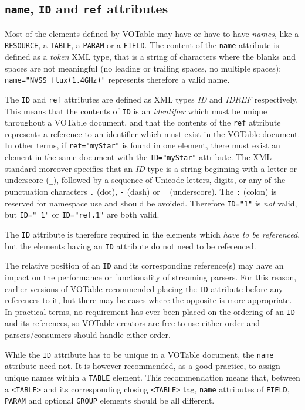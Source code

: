 \documentclass[11pt,a4paper]{ivoa}
\let\fg=\color
\def\slash {{\fg{blue}/}}
\def\attr#1{{\tt{\fg{DarkRed}#1}}}
\def\elem#1{{\tt{\fg{DarkRed}#1}}}
\def\attrval#1#2{{\tt{\fg{DarkRed}#1}="{\fg{DarkPurple}#2}"}}
\def\elemdef#1#2{{\tt\fg{blue}<}{\tt{\fg{DarkRed}#1}#2}{\tt\fg{blue}>}}
\begin{document}
\subsection{{\attr{name}, \attr{ID} and \attr{ref} attributes}}
\label{sec:name}

Most of the elements defined by VOTable may have or have to have {\em names},
like a \elem{RESOURCE}, a \elem{TABLE}, a \elem{PARAM} or a \elem{FIELD}.
The content of the \attr{name} attribute is defined as a {\em token}
XML type,
that is a string of characters where the blanks and spaces are not
meaningful (no leading or trailing spaces, no multiple spaces):
\attrval{name}{NVSS flux(1.4GHz)} represents therefore
a valid name.

The \attr{ID} and \attr{ref} attributes are defined as XML types {\em ID}
and {\em IDREF} respectively. This means that the contents of \attr{ID}
is an {\em identifier} which must be {unique} throughout a VOTable document,
and that the contents of the \attr{ref} attribute represents a reference to
an identifier which must exist in the VOTable document.
In other terms, if \attrval{ref}{myStar} is found in one element,
there must exist an element in the same document with the
\attrval{ID}{myStar} attribute. The XML standard moreover specifies
that an {\em ID} type is a string beginning with a letter or
underscore ({\tt{\_}}),
followed by a sequence of Unicode letters, digits, or any of the
punctuation characters {\tt.} (dot), {\tt-} (dash) or {\tt\_} (underscore).
The {\tt:} (colon) is reserved for namespace use and should be avoided.
Therefore \attrval{ID}{1} is {\em not} valid,
but \attrval{ID}{\_1} or \attrval{ID}{ref.1} are both valid.

The {\attr{ID}} attribute %
is therefore required in the elements which {\em have to be referenced},
but the elements having an {\attr{ID}} attribute do not need to be
referenced.

The relative position of an \attr{ID} and its corresponding reference(s)
may have an impact on the performance or functionality of streaming parsers.
For this reason, earlier versions of VOTable recommended placing
the \attr{ID} attribute before any references to it,
but there may be cases where the opposite is more appropriate.
In practical terms, no requirement has ever been placed on the ordering
of an \attr{ID} and its references, so VOTable creators are free to use either
order and parsers/consumers should handle either order.

While the {\attr{ID}} attribute has to be unique in a VOTable document,
the {\attr{name}} attribute need not. It is however recommended,
as a good practice, to assign unique names within a \elem{TABLE} element.
This recommendation means that,
between a \elemdef{TABLE}{} and its corresponding closing
\elemdef{\slash TABLE}{} tag,
{\attr{name}} attributes of \elem{FIELD}, \elem{PARAM} and
optional \elem{GROUP} elements should be all different.
\end{document}
